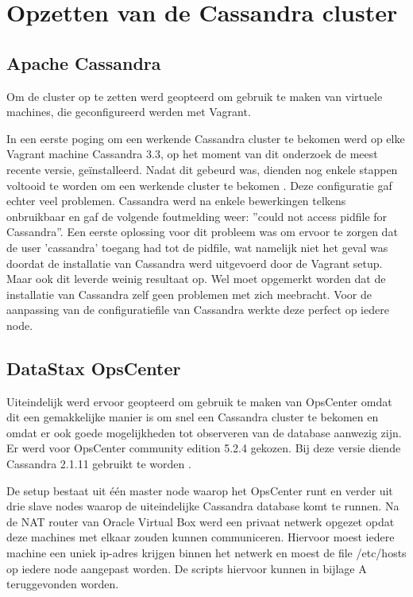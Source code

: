 \chapter{Opzetten van de Cassandra cluster}
\label{ch:cassandra_cluster}

\section{Apache Cassandra}
Om de cluster op te zetten werd geopteerd om gebruik te maken van virtuele machines, die geconfigureerd werden met Vagrant.

In een eerste poging om een werkende Cassandra cluster te bekomen werd op elke Vagrant machine Cassandra 3.3, op het moment van dit onderzoek de meest recente versie, geïnstalleerd.
Nadat dit gebeurd was, dienden nog enkele stappen voltooid te worden om een werkende cluster te bekomen \citep{DataStax2016}.
Deze configuratie gaf echter veel problemen.
Cassandra werd na enkele bewerkingen telkens onbruikbaar en gaf de volgende foutmelding weer: ''could not access pidfile for Cassandra''.
Een eerste oplossing voor dit probleem was om ervoor te zorgen dat de user 'cassandra' toegang had tot de pidfile, wat namelijk niet het geval was doordat de installatie van Cassandra werd uitgevoerd door de Vagrant setup.
Maar ook dit leverde weinig resultaat op.
Wel moet opgemerkt worden dat de installatie van Cassandra zelf geen problemen met zich meebracht.
Voor de aanpassing van de configuratiefile van Cassandra werkte deze perfect op iedere node.

\section{DataStax OpsCenter}

Uiteindelijk werd ervoor geopteerd om gebruik te maken van OpsCenter omdat dit een gemakkelijke manier is om snel een Cassandra cluster te bekomen en omdat er ook goede mogelijkheden tot observeren van de database aanwezig zijn.
Er werd voor OpsCenter community edition 5.2.4 gekozen.
Bij deze versie diende Cassandra 2.1.11 gebruikt te worden \citep{Cantoni2016}.

De setup bestaat uit één master node waarop het OpsCenter runt en verder uit drie slave nodes waarop de uiteindelijke Cassandra database komt te runnen.
Na de NAT router van Oracle Virtual Box werd een privaat netwerk opgezet opdat deze machines met elkaar zouden kunnen communiceren.
Hiervoor moest iedere machine een uniek ip-adres krijgen binnen het netwerk en moest de file /etc/hosts op iedere node aangepast worden.
De scripts hiervoor kunnen in bijlage A teruggevonden worden.

